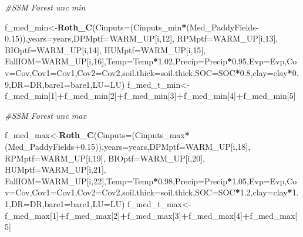 \documentclass[
  10pt,
  b5paper,
]{book}
\newenvironment{Shaded}{\begin{snugshade}}{\end{snugshade}}
\newcommand{\CommentTok}[1]{\textcolor[rgb]{0.56,0.35,0.01}{\textit{#1}}}
\newcommand{\DataTypeTok}[1]{\textcolor[rgb]{0.13,0.29,0.53}{#1}}
\newcommand{\DecValTok}[1]{\textcolor[rgb]{0.00,0.00,0.81}{#1}}
\newcommand{\FloatTok}[1]{\textcolor[rgb]{0.00,0.00,0.81}{#1}}
\newcommand{\KeywordTok}[1]{\textcolor[rgb]{0.13,0.29,0.53}{\textbf{#1}}}
\newcommand{\NormalTok}[1]{#1}
\newcommand{\OperatorTok}[1]{\textcolor[rgb]{0.81,0.36,0.00}{\textbf{#1}}}
\begin{document}
\begin{Shaded}
\begin{Highlighting}[]
{\CommentTok{#SSM Forest unc min}

\NormalTok{f_med_min<-}\KeywordTok{Roth_C}\NormalTok{(}\DataTypeTok{Cinputs=}\NormalTok{(Cinputs_min}\OperatorTok{*}\NormalTok{(Med_PaddyFields}\FloatTok{-0.15}\NormalTok{)),}\DataTypeTok{years=}\NormalTok{years,}\DataTypeTok{DPMptf=}\NormalTok{WARM_UP[i,}\DecValTok{12}\NormalTok{], }\DataTypeTok{RPMptf=}\NormalTok{WARM_UP[i,}\DecValTok{13}\NormalTok{], }\DataTypeTok{BIOptf=}\NormalTok{WARM_UP[i,}\DecValTok{14}\NormalTok{], }\DataTypeTok{HUMptf=}\NormalTok{WARM_UP[i,}\DecValTok{15}\NormalTok{], }\DataTypeTok{FallIOM=}\NormalTok{WARM_UP[i,}\DecValTok{16}\NormalTok{],}\DataTypeTok{Temp=}\NormalTok{Temp}\OperatorTok{*}\FloatTok{1.02}\NormalTok{,}\DataTypeTok{Precip=}\NormalTok{Precip}\OperatorTok{*}\FloatTok{0.95}\NormalTok{,}\DataTypeTok{Evp=}\NormalTok{Evp,}\DataTypeTok{Cov=}\NormalTok{Cov,}\DataTypeTok{Cov1=}\NormalTok{Cov1,}\DataTypeTok{Cov2=}\NormalTok{Cov2,}\DataTypeTok{soil.thick=}\NormalTok{soil.thick,}\DataTypeTok{SOC=}\NormalTok{SOC}\OperatorTok{*}\FloatTok{0.8}\NormalTok{,}\DataTypeTok{clay=}\NormalTok{clay}\OperatorTok{*}\FloatTok{0.9}\NormalTok{,}\DataTypeTok{DR=}\NormalTok{DR,}\DataTypeTok{bare1=}\NormalTok{bare1,}\DataTypeTok{LU=}\NormalTok{LU)}
\NormalTok{f_med_t_min<-f_med_min[}\DecValTok{1}\NormalTok{]}\OperatorTok{+}\NormalTok{f_med_min[}\DecValTok{2}\NormalTok{]}\OperatorTok{+}\NormalTok{f_med_min[}\DecValTok{3}\NormalTok{]}\OperatorTok{+}\NormalTok{f_med_min[}\DecValTok{4}\NormalTok{]}\OperatorTok{+}\NormalTok{f_med_min[}\DecValTok{5}\NormalTok{]}

\CommentTok{#SSM Forest unc max}

\NormalTok{f_med_max<-}\KeywordTok{Roth_C}\NormalTok{(}\DataTypeTok{Cinputs=}\NormalTok{(Cinputs_max}\OperatorTok{*}\NormalTok{(Med_PaddyFields}\FloatTok{+0.15}\NormalTok{)),}\DataTypeTok{years=}\NormalTok{years,}\DataTypeTok{DPMptf=}\NormalTok{WARM_UP[i,}\DecValTok{18}\NormalTok{], }\DataTypeTok{RPMptf=}\NormalTok{WARM_UP[i,}\DecValTok{19}\NormalTok{], }\DataTypeTok{BIOptf=}\NormalTok{WARM_UP[i,}\DecValTok{20}\NormalTok{], }\DataTypeTok{HUMptf=}\NormalTok{WARM_UP[i,}\DecValTok{21}\NormalTok{], }\DataTypeTok{FallIOM=}\NormalTok{WARM_UP[i,}\DecValTok{22}\NormalTok{],}\DataTypeTok{Temp=}\NormalTok{Temp}\OperatorTok{*}\FloatTok{0.98}\NormalTok{,}\DataTypeTok{Precip=}\NormalTok{Precip}\OperatorTok{*}\FloatTok{1.05}\NormalTok{,}\DataTypeTok{Evp=}\NormalTok{Evp,}\DataTypeTok{Cov=}\NormalTok{Cov,}\DataTypeTok{Cov1=}\NormalTok{Cov1,}\DataTypeTok{Cov2=}\NormalTok{Cov2,}\DataTypeTok{soil.thick=}\NormalTok{soil.thick,}\DataTypeTok{SOC=}\NormalTok{SOC}\OperatorTok{*}\FloatTok{1.2}\NormalTok{,}\DataTypeTok{clay=}\NormalTok{clay}\OperatorTok{*}\FloatTok{1.1}\NormalTok{,}\DataTypeTok{DR=}\NormalTok{DR,}\DataTypeTok{bare1=}\NormalTok{bare1,}\DataTypeTok{LU=}\NormalTok{LU)}
\NormalTok{f_med_t_max<-f_med_max[}\DecValTok{1}\NormalTok{]}\OperatorTok{+}\NormalTok{f_med_max[}\DecValTok{2}\NormalTok{]}\OperatorTok{+}\NormalTok{f_med_max[}\DecValTok{3}\NormalTok{]}\OperatorTok{+}\NormalTok{f_med_max[}\DecValTok{4}\NormalTok{]}\OperatorTok{+}\NormalTok{f_med_max[}\DecValTok{5}\NormalTok{]}

}
\end{Highlighting}
\end{Shaded}
\end{document}
